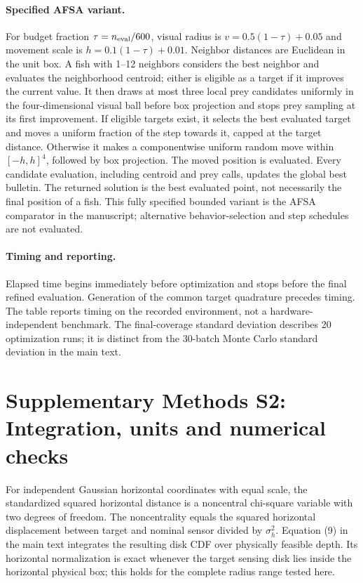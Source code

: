 \documentclass[10pt]{article}
\begin{document}
\paragraph{Specified AFSA variant.} For budget fraction $\tau=n_{\rm eval}/600$, visual radius is $v=0.5(1-\tau)+0.05$ and movement scale is $h=0.1(1-\tau)+0.01$. Neighbor distances are Euclidean in the unit box. A fish with 1--12 neighbors considers the best neighbor and evaluates the neighborhood centroid; either is eligible as a target if it improves the current value. It then draws at most three local prey candidates uniformly in the four-dimensional visual ball before box projection and stops prey sampling at its first improvement. If eligible targets exist, it selects the best evaluated target and moves a uniform fraction of the step towards it, capped at the target distance. Otherwise it makes a componentwise uniform random move within $[-h,h]^4$, followed by box projection. The moved position is evaluated. Every candidate evaluation, including centroid and prey calls, updates the global best bulletin. The returned solution is the best evaluated point, not necessarily the final position of a fish. This fully specified bounded variant is the AFSA comparator in the manuscript; alternative behavior-selection and step schedules are not evaluated.

\paragraph{Timing and reporting.} Elapsed time begins immediately before optimization and stops before the final refined evaluation. Generation of the common target quadrature precedes timing. The table reports timing on the recorded environment, not a hardware-independent benchmark. The final-coverage standard deviation describes 20 optimization runs; it is distinct from the 30-batch Monte Carlo standard deviation in the main text.

\begin{table}[htbp]\centering\small
\caption{Repeated algorithm comparison. Final objective values are reevaluated with 48 depth nodes and $11\times7\times15$ target nodes. SD is in percentage points. Each method has 20 independent runs and a maximum allowance of 600 calls per run.}

\end{table}

\section*{Supplementary Methods S2: Integration, units and numerical checks}
For independent Gaussian horizontal coordinates with equal scale, the standardized squared horizontal distance is a noncentral chi-square variable with two degrees of freedom. The noncentrality equals the squared horizontal displacement between target and nominal sensor divided by $\sigma_h^2$. Equation (9) in the main text integrates the resulting disk CDF over physically feasible depth. Its horizontal normalization is exact whenever the target sensing disk lies inside the horizontal physical box; this holds for the complete radius range tested here.
\end{document}
